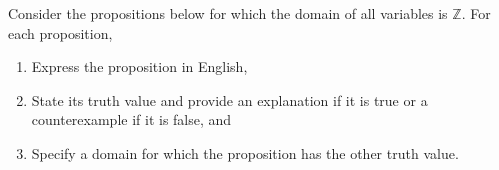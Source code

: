 \documentclass[addpoints]{exam}
\begin{document}
\begin{questions}

\question
  Consider the propositions below for which the domain of all variables is $\mathbb{Z}$. For each proposition,
  \begin{enumerate}
  \item Express the proposition in English,
  \item State its truth value and provide an explanation if it is true or a counterexample if it is false, and
  \item Specify a domain for which the proposition has the other truth value.
  \end{enumerate}

  
\end{questions}
\end{document}
